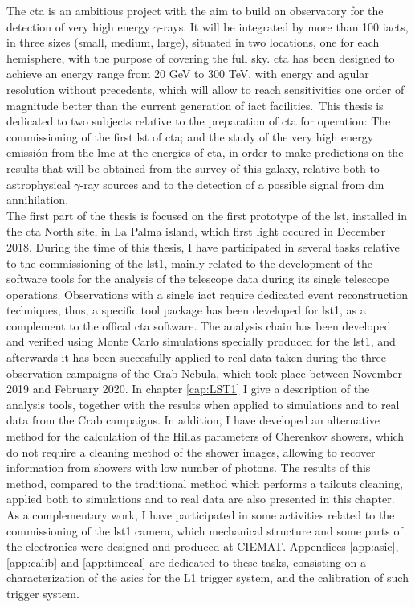 \documentclass[main.tex]{subfiles}
\begin{document}
\glsresetall

The \gls{cta} is an ambitious project with the aim to build an observatory for the detection of very high energy $\gamma$-rays. It will be integrated by more than 100 \glspl{iact}, in three sizes (small, medium, large), situated in two locations, one for each hemisphere, with the purpose of covering the full sky. \gls{cta} has been designed to achieve an energy range from 20 GeV to 300 TeV, with energy and agular resolution without precedents, which will allow to reach sensitivities one order of magnitude better than the current generation of \gls{iact} facilities.\
This thesis is dedicated to two subjects relative to the preparation of \gls{cta} for operation: The commissioning of the first \gls{lst} of \gls{cta}; and the study of the very high energy emissión from the \gls{lmc} at the energies of \gls{cta}, in order to make predictions on the results that will be obtained from the survey of this galaxy, relative both to astrophysical $\gamma$-ray sources and to the detection of a possible signal from \gls{dm} annihilation.\\

The first part of the thesis is focused on the first prototype of the \gls{lst}, installed in the \gls{cta} North site, in La Palma island, which first light occured in December 2018.
During the time of this thesis, I have participated in several tasks relative to the commissioning of the \gls{lst}1, mainly related to the development of the software tools for the analysis of the telescope data during its single telescope operations. Observations with a single \gls{iact} require dedicated event reconstruction techniques, thus, a specific tool package has been developed for \gls{lst}1, as a complement to the offical \gls{cta} software. The analysis chain has been developed and verified using Monte Carlo simulations specially produced for the \gls{lst}1, and afterwards it has been succesfully applied to real data taken during the three observation campaigns of the Crab Nebula, which took place between November 2019 and February 2020. In chapter \ref{cap:LST1} I give a description of the analysis tools, together with the results when applied to simulations and to real data from the Crab campaigns. In addition, I have developed an alternative method for the calculation of the Hillas parameters of Cherenkov showers, which do not require a cleaning method of the shower images, allowing to recover information from showers with low number of photons. The results of this method, compared to the traditional method which performs a tailcuts cleaning, applied both to simulations and to real data are also presented in this chapter. As a complementary work, I have participated in some activities related to the commissioning of the \gls{lst}1 camera, which mechanical structure and some parts of the electronics were designed and produced at CIEMAT. Appendices \ref{app:asic}, \ref{app:calib} and \ref{app:timecal} are dedicated to these tasks, consisting on a characterization of the \glspl{asic} for the L1 trigger system, and the calibration of such trigger system.\\
\end{document}
